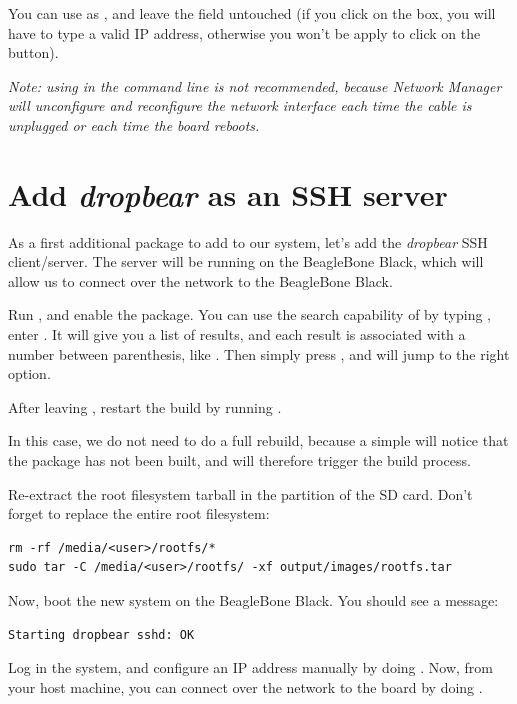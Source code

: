 You can use  as , and leave the
 field untouched (if you click on the  box, you
will have to type a valid IP address, otherwise you won't be apply to
click on the  button).

{\em Note: using  in the command line is not
recommended, because Network Manager will unconfigure and reconfigure
the network interface each time the cable is unplugged or each time
the board reboots.}

\section{Add {\em dropbear} as an SSH server}

As a first additional package to add to our system, let's add the {\em
dropbear} SSH client/server. The server will be running on the
BeagleBone Black, which will allow us to connect over the network to
the BeagleBone Black.

Run , and enable the 
package. You can use the search capability of  by
typing \code{/}, enter . It will give you a list of
results, and each result is associated with a number between
parenthesis, like . Then simply press , and
 will jump to the right option.

After leaving , restart the build by running
.

In this case, we do not need to do a full rebuild, because a simple
 will notice that the  package has not been
built, and will therefore trigger the build process.

Re-extract the root filesystem tarball in the  partition
of the SD card. Don't forget to replace the entire root filesystem:

\begin{verbatim}
rm -rf /media/<user>/rootfs/*
sudo tar -C /media/<user>/rootfs/ -xf output/images/rootfs.tar
\end{verbatim}

Now, boot the new system on the BeagleBone Black. You should see a
message:

\begin{verbatim}
Starting dropbear sshd: OK
\end{verbatim}

Log in the system, and configure an IP address manually by doing
. Now, from your host machine, you can
connect over the network to the board by doing .

